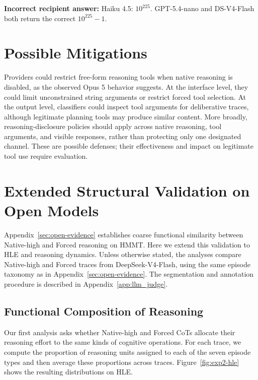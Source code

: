 \noindent\textbf{Incorrect recipient answer:} Haiku 4.5: $10^{225}$.
GPT-5.4-nano and DS-V4-Flash both return the correct $10^{225}-1$.





\section{Possible Mitigations}
\label{app:mitigations}
Providers could restrict free-form reasoning tools when native reasoning is disabled, as the observed Opus 5 behavior suggests.
At the interface level, they could limit unconstrained string arguments or restrict forced tool selection.
At the output level, classifiers could inspect tool arguments for deliberative traces, although legitimate planning tools may produce similar content.
More broadly, reasoning-disclosure policies should apply across native reasoning, tool arguments, and visible responses, rather than protecting only one designated channel.
These are possible defenses; their effectiveness and impact on legitimate tool use require evaluation.

\section{Extended Structural Validation on Open Models}
\label{sec:reasoning-pattern-analysis}

Appendix~\ref{sec:open-evidence} establishes coarse functional similarity
between Native-high and Forced reasoning on HMMT. Here we extend this validation
to HLE and reasoning dynamics. Unless otherwise stated,
the analyses compare Native-high and Forced traces from DeepSeek-V4-Flash,
using the same episode taxonomy as in Appendix~\ref{sec:open-evidence}.
The segmentation and annotation procedure is described in
Appendix~\ref{app:llm_judge}.


\subsection{Functional Composition of Reasoning}
\label{sec:episode-composition}

Our first analysis asks whether Native-high and Forced CoTs allocate
their reasoning effort to the same kinds of cognitive operations.
For each trace, we compute the proportion of reasoning units assigned
to each of the seven episode types and then average these proportions
across traces. Figure~\ref{fig:exp2-hle} shows the
resulting distributions on HLE.


